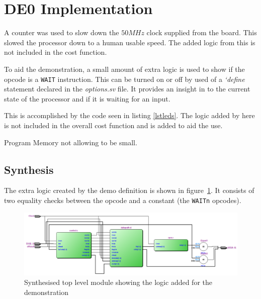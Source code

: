 
\section{DE0 Implementation}\label{sect:de0}



A counter was used to slow down the $50MHz$ clock supplied from the board. 
This slowed the processor down to a human usable speed.
The added logic from this is not included in the cost function.


To aid the demonstration, a small amount of extra logic is used to show if the opcode is a \texttt{WAIT} instruction. 
This can be turned on or off by used of a \textit{`define} statement declared in the \textit{options.sv} file.
It provides an insight in to the current state of the processor and if it is waiting for an input.

This is accomplished by the code seen in listing \ref{lstleds}.
The logic added by here is not included in the overall cost function and is added to aid the use. 





Program Memory not allowing to be small. 


\subsection{Synthesis}

The extra logic created by the demo definition is shown in figure~\ref{fig:cpudemosynth}.
It consists of two equality checks between the opcode and a constant (the \texttt{WAITn} opcodes).



\begin{figure}
\includegraphics[width=\textwidth]{Figures/cpudemosynth.png}
\caption{Synthesised top level module showing the logic added for the demonstration}
\label{fig:cpudemosynth}
\end{figure}

